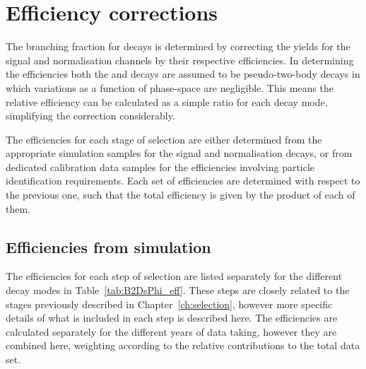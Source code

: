 \section{Efficiency corrections}
\label{sec:B2DsPhi_effcorrections}

The branching fraction for \decay{\Bp}{\Dsp\phiz} decays is determined by correcting the yields for the signal and normalisation channels by their respective efficiencies. In determining the efficiencies both the \decay{\Bp}{\Dsp\phiz} and \decay{\Bp}{\Dsp\Dzb} decays are assumed to be pseudo-two-body decays in which variations as a function of phase-space are negligible. This means the relative efficiency can be calculated as a simple ratio for each \Dsp decay mode, simplifying the correction considerably.    

The efficiencies for each stage of selection are either determined from the appropriate simulation samples for the signal and normalisation decays, or from dedicated calibration data samples for the efficiencies involving particle identification requirements. 
Each set of efficiencies are determined with respect to the previous one, such that the total efficiency is given by the product of each of them.


\subsection{Efficiencies from simulation}

The efficiencies for each step of selection are listed separately for the different \Dsp decay modes in Table~\ref{tab:B2DsPhi_eff}. These steps are closely related to the stages previously described in Chapter~\ref{ch:selection}, however more specific details of what is included in each step is described here. The efficiencies are calculated separately for the different years of data taking, however they are combined here, weighting according to the relative contributions to the total data set. 


